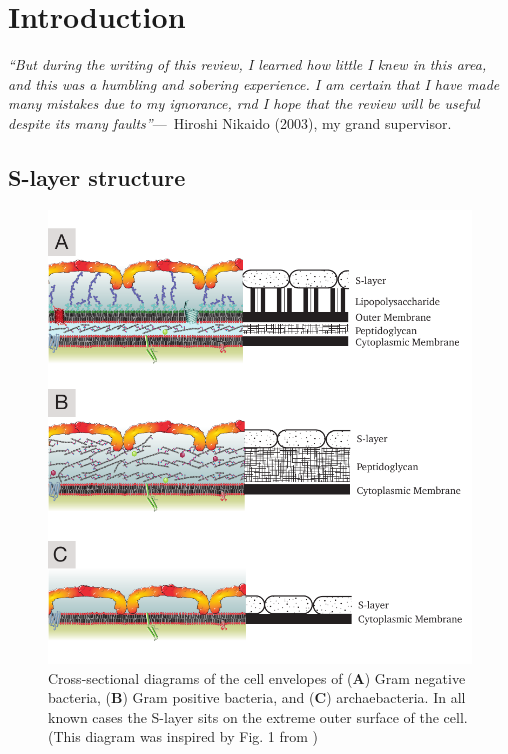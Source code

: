 
\acresetall{}

\chapter{Introduction}
\label{ch:Introduction}

    \begin{epigraph}
            \emph{``But during the writing of this review, I learned how little I knew in this area, and this was a humbling and sobering experience. I am certain that I have made many mistakes due to my ignorance, rnd I hope that the review will be useful despite its many faults''}---~Hiroshi Nikaido (2003), my grand supervisor.
    \end{epigraph}
    \section{S-layer structure} %
    \label{sec:s_layer_structure}
    
        \begin{figure}[p] %
                \begin{center}
                    \includegraphics{intro/img/celwalls.pdf}
                \end{center}
                \caption[Cross-sectional diagrams of \ac{S-layer} containing cell envelopes]{Cross-sectional diagrams of the cell envelopes of (\textbf{A}) Gram negative bacteria, (\textbf{B}) Gram positive bacteria, and (\textbf{C}) archaebacteria. In all known cases the \ac{S-layer} sits on the extreme outer surface of the cell. (This diagram was inspired by Fig. 1 from )}
            \label{fig:cellwalls}
        \end{figure}

